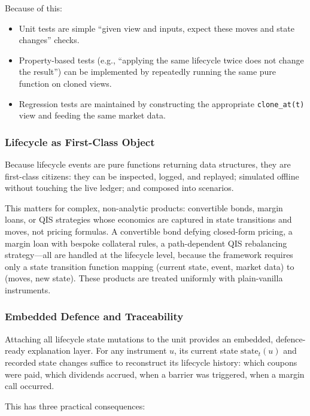 \documentclass[11pt,a4paper]{article}
\begin{document}
Because of this:
\begin{itemize}[nosep]
\item Unit tests are simple ``given view and inputs, expect these moves and state changes'' checks.
\item Property-based tests (e.g., ``applying the same lifecycle twice does not change the result'') can be implemented by repeatedly running the same pure function on cloned views.
\item Regression tests are maintained by constructing the appropriate \texttt{clone\_at(t)} view and feeding the same market data.
\end{itemize}

\subsubsection{Lifecycle as First-Class Object}

Because lifecycle events are pure functions returning data structures, they are first-class citizens: they can be inspected, logged, and replayed; simulated offline without touching the live ledger; and composed into scenarios.

This matters for complex, non-analytic products: convertible bonds, margin loans, or QIS strategies whose economics are captured in state transitions and moves, not pricing formulas. A convertible bond defying closed-form pricing, a margin loan with bespoke collateral rules, a path-dependent QIS rebalancing strategy---all are handled at the lifecycle level, because the framework requires only a state transition function mapping (current state, event, market data) to (moves, new state). These products are treated uniformly with plain-vanilla instruments.

\subsubsection{Embedded Defence and Traceability}

Attaching all lifecycle state mutations to the unit provides an embedded, defence-ready explanation layer. For any instrument $u$, its current state $\text{state}_t(u)$ and recorded state changes suffice to reconstruct its lifecycle history: which coupons were paid, which dividends accrued, when a barrier was triggered, when a margin call occurred.

This has three practical consequences:
\end{document}

